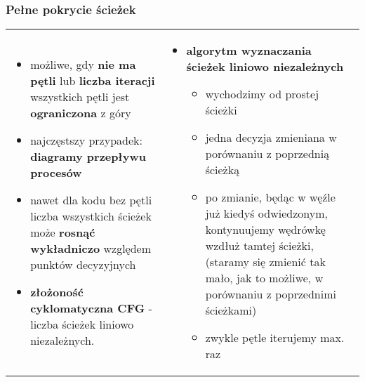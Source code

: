 \documentclass[../main.tex]{subfiles}
\begin{document}
    \subsubsection{Pełne pokrycie ścieżek}
    \begin{table}[H]
        \begin{center}
            \begin{tabular}{p{8cm} p{8cm}}
                \begin{itemize}
                    \item możliwe, gdy \textbf{nie ma pętli} lub \textbf{liczba iteracji} wszystkich pętli jest \textbf{ograniczona} z góry
                    \item najczęstszy przypadek: \textbf{diagramy przepływu procesów}
                    \item nawet dla kodu bez pętli liczba wszystkich ścieżek może \textbf{rosnąć wykładniczo} względem punktów decyzyjnych
                    \item \textbf{złożoność cyklomatyczna CFG} - liczba ścieżek liniowo niezależnych.
                \end{itemize}
                &
                \begin{itemize}
                    \item \textbf{algorytm wyznaczania ścieżek liniowo niezależnych}
                    \begin{itemize}
                        \item wychodzimy od prostej ścieżki
                        \item jedna decyzja zmieniana w porównaniu z poprzednią ścieżką
                        \item po zmianie, będąc w węźle już kiedyś odwiedzonym, kontynuujemy wędrówkę wzdłuż tamtej ścieżki,
                        (staramy się zmienić tak mało, jak to możliwe, w porównaniu z poprzednimi ścieżkami)
                        \item zwykle pętle iterujemy max. raz
                    \end{itemize}
                \end{itemize}
            \end{tabular}
        \end{center}
    \end{table}
\end{document}
